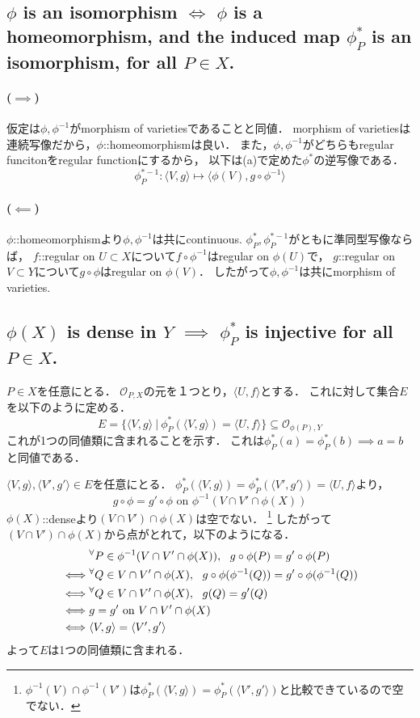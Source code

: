 \documentclass[a4paper]{jarticle}
\newcommand{\reg}[2]{\langle #1,#2 \rangle}
\begin{document}
    \subsection{$\phi$ is an isomorphism $\iff$ $\phi$ is a homeomorphism, and the induced map $\phi_P^{\ast}$ is an isomorphism, for all $P \in X$.}
    \paragraph{($\implies$)}
    仮定は$\phi, \phi^{-1}$がmorphism of varietiesであることと同値．
    morphism of varietiesは連続写像だから，$\phi$::homeomorphismは良い．
    また，$\phi, \phi^{-1}$がどちらもregular funcitonをregular functionにするから，
    以下は(a)で定めた$\phi^{\ast}$の逆写像である．
    \[ \phi_P^{\ast -1}: \reg{V}{g} \mapsto \reg{\phi(V)}{g \circ \phi^{-1}} \]

    \paragraph{($\impliedby$)}
    $\phi$::homeomorphismより$\phi, \phi^{-1}$は共にcontinuous.
    $\phi_P^{\ast}, \phi_P^{\ast -1}$がともに準同型写像ならば，
    $f$::regular on $U \subset X$について$f \circ \phi^{-1}$はregular on $\phi(U)$で，
    $g$::regular on $V \subset Y$について$g \circ \phi$はregular on $\phi(V)$．
    したがって$\phi, \phi^{-1}$は共にmorphism of varieties.

    \subsection{$\phi(X)$ is dense in $Y$ $\implies$ $\phi_P^{\ast}$ is injective for all $P \in X$.}
    $P \in X$を任意にとる．
    $\mathcal{O}_{P, X}$の元を１つとり，$\reg{U}{f}$とする．
    これに対して集合$E$を以下のように定める．
    \[ E=\{\reg{V}{g} ~|~ \phi_P^{\ast}(\reg{V}{g})=\reg{U}{f} \} \subseteq \mathcal{O}_{\phi(P), Y} \]
    これが1つの同値類に含まれることを示す．
    これは$\phi_P^{\ast}(a)=\phi_P^{\ast}(b) \implies a=b$と同値である．

    $\reg{V}{g}, \reg{V'}{g'} \in E$を任意にとる．
    $\phi_P^{\ast}(\reg{V}{g})=\phi_P^{\ast}(\reg{V'}{g'})=\reg{U}{f}$より，
    \[ g \circ \phi=g' \circ \phi \mbox{ on } \phi^{-1}(V \cap V' \cap \phi(X)) \]
    $\phi(X)$::denseより$(V \cap V') \cap \phi(X)$は空でない．
    \footnote{$\phi^{-1}(V) \cap \phi^{-1}(V')$は$\phi_P^{\ast}(\reg{V}{g})=\phi_P^{\ast}(\reg{V'}{g'})$と比較できているので空でない．}
    したがって$(V \cap V') \cap \phi(X)$から点がとれて，以下のようになる．
    \begin{align*}
    {}&     \Forall{P \in \phi^{-1}(V \cap V' \cap \phi(X))} g \circ \phi(P)=g' \circ \phi(P) \\
    \iff&   \Forall{Q \in V \cap V' \cap \phi(X)} g \circ \phi(\phi^{-1}(Q))=g' \circ \phi(\phi^{-1}(Q)) \\
    \iff&   \Forall{Q \in V \cap V' \cap \phi(X)} g(Q)=g'(Q) \\
    \iff&   g=g'\mbox{ on }V \cap V' \cap \phi(X) \\
    \iff&   \reg{V}{g}=\reg{V'}{g'}
    \end{align*}
    よって$E$は1つの同値類に含まれる．
\end{document}
